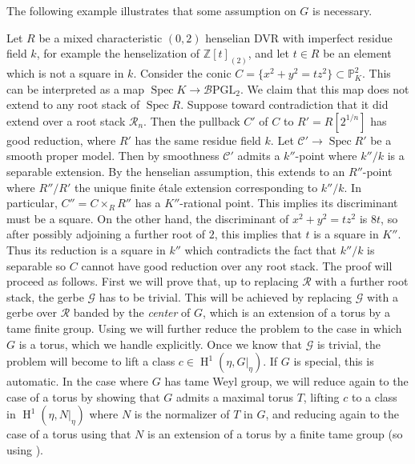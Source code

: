\documentclass{amsart}
\theoremstyle{definition}
\newenvironment{example}
  {\pushQED{\qed}\renewcommand{\qedsymbol}{$\diamondsuit$}\examplex}
  {\popQED\endexamplex}
\newcommand{\bZ}{\mathbb{Z}}
\newcommand{\cG}{\mathcal{G}}
\newcommand{\cB}{\mathcal{B}}
\newcommand{\cC}{\mathcal{C}}
\newcommand{\oH}{\operatorname{H}}
\newcommand{\cR}{\mathcal{R}}
\DeclareMathOperator{\Spec}{Spec}
\newcommand{\spec}{\operatorname{Spec}}
\begin{document}
\noindent The following example illustrates that some assumption on $G$ is necessary. 

\begin{example}\label{ex:tame_is_necessary} Let $R$ be a mixed characteristic $(0,2)$ henselian DVR with imperfect residue field $k$, for example the henselization of $\bZ[t]_{(2)}$, and let $t \in R$ be an element which is not a square in $k$. Consider the conic $C = \{x^2 + y^2 = tz^2\} \subset \mathbb{P}^2_K$. This can be interpreted as a map $\Spec K \to \cB \mathrm{PGL}_2$. We claim that this map does not extend to any root stack of $\spec R$. Suppose toward contradiction that it did extend over a root stack $\cR_n$. Then the pullback $C'$ of $C$ to $R' = R[2^{1/n}]$ has good reduction, where $R'$ has the same residue field $k$. Let $\cC' \to \spec R'$ be a smooth proper model. Then by smoothness $\cC'$ admits a $k''$-point where $k''/k$ is a separable extension. By the henselian assumption, this extends to an $R''$-point where $R''/R'$ the unique finite \'etale extension corresponding to $k''/k$. In particular, $C'' = C \times_R R''$ has a $K''$-rational point. This implies its discriminant must be a square. On the other hand, the discriminant of $x^2 + y^2 = tz^2$ is $8t$, so after possibly adjoining a further root of $2$, this implies that $t$ is a square in $K''$. Thus its reduction is a square in $k''$ which contradicts the fact that $k''/k$ is separable so $C$ cannot have good reduction over any root stack. 
\end{example}
The proof will proceed as follows. First we will prove that, up to replacing $\cR $ with a further root stack, the gerbe $\cG$ has to be trivial. This will be achieved by replacing $\cG$ with a gerbe over $\cR$ banded by the \textit{center} of $G$, which is an extension of a torus by a tame finite group. Using \cite{bresciani2024arithmetic} we will further reduce the problem to the case in which $G$ is a torus, which we handle explicitly. Once we know that $\cG$ is trivial, the problem will become to lift a class $c\in \oH^1(\eta,G|_\eta)$. If $G$ is special, this is automatic. In the case where $G$ has tame Weyl group, we will reduce again to the case of a torus by showing that $G$ admits a maximal torus $T$, lifting $c$ to a class in $\oH^1(\eta,N|_\eta)$ where $N$ is the normalizer of $T$ in $G$, and reducing again to the case of a torus using that $N$ is an extension of a torus by a finite tame group (so using \cite{bresciani2024arithmetic}). 
\end{document}
